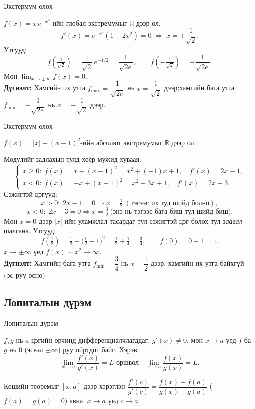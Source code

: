 \begin{frame}[allowframebreaks]{Экстермум олох}
\begin{example}
$f(x)=x\,e^{-x^2}$-ийн глобал экстремумыг $\mathbb{R}$ дээр ол.
\[
f'(x)=e^{-x^2}(1-2x^2)=0 \;\Rightarrow\; x=\pm \frac{1}{\sqrt2}.
\]
Утгууд:
\[
f\!\left(\tfrac{1}{\sqrt2}\right)=\frac{1}{\sqrt2}\,e^{-1/2}=\frac{1}{\sqrt{2e}},\qquad
f\!\left(-\tfrac{1}{\sqrt2}\right)=-\frac{1}{\sqrt{2e}}.
\]
Мөн $\lim_{x\to\pm\infty}f(x)=0$. \\
\textbf{Дүгнэлт:} Хамгийн их утга $f_{\max}=\dfrac{1}{\sqrt{2e}}$ нь $x=\dfrac{1}{\sqrt2}$ дээр;хамгийн бага утга $f_{\min}=-\dfrac{1}{\sqrt{2e}}$ нь $x=-\dfrac{1}{\sqrt2}$ дээр.
\end{example}
\end{frame}

\begin{frame}[allowframebreaks]{Экстермум олох}
\begin{example}
$f(x)=|x|+(x-1)^2$-ийн абсолют экстремумыг $\mathbb{R}$ дээр ол.

Модулийг задлахын тулд хоёр мужид хуваая. 
\[
\begin{cases}
x\ge 0:\; f(x)=x+(x-1)^2 = x^2+(-1)x+1, \quad f'(x)=2x-1,\\[2pt]
x<0:\; f(x)=-x+(x-1)^2 = x^2-3x+1, \quad f'(x)=2x-3.
\end{cases}
\]
Сэжигтэй цэгүүд:
\[
x> 0:\; 2x-1=0 \Rightarrow x=\tfrac12\ (\text{тэгээс их тул шийд болно}),\]
\[
x<0:\; 2x-3=0 \Rightarrow x=\tfrac32\ \text{(энэ нь тэгээс бага биш тул шийд биш)}.
\]
Мөн $x=0$ дээр $|x|$-ийн уламжлал тасардаг тул сэжигтэй цэг болох тул \emph{заавал} шалгана.
Утгууд:
\[
f\!\left(\tfrac12\right)=\tfrac12+\Big(\tfrac12-1\Big)^2=\tfrac12+\tfrac14=\tfrac34,\qquad
f(0)=0+1=1.
\]
$x\to\pm\infty$ үед $f(x)\sim x^2\to\infty$. \\
\textbf{Дүгнэлт:} Хамгийн бага утга $f_{\min}=\dfrac{3}{4}$ нь $x=\dfrac12$ дээр, хамгийн их утга байхгүй (∞ руу өснө)    
\end{example} 
\end{frame}

\subsection{Лопиталын дүрэм}
\begin{frame}[allowframebreaks]{Лопиталын дүрэм}
\begin{theorem}[Лопитал]
$f,g$ нь $a$ цэгийн орчинд дифференциалчлагддаг, $g'(x)\ne0$, мөн $x\to a$ үед $f$ ба $g$ нь $0$ (эсвэл $\pm\infty$) руу ойртдог байг. Хэрэв
\[
\lim_{x\to a}\frac{f'(x)}{g'(x)}=L \text{ оршвол}\quad 
\lim_{x\to a}\frac{f(x)}{g(x)}=L.
\]
\end{theorem}

\begin{prof}
Кошийн теоремыг $[x,a]$ дээр хэрэглэн $\dfrac{f'(c)}{g'(c)}=\dfrac{f(x)-f(a)}{g(x)-g(a)}$ ($f(a)=g(a)=0$) авна. $x\to a$ үед $c\to a$.
\end{prof}
\end{frame}

